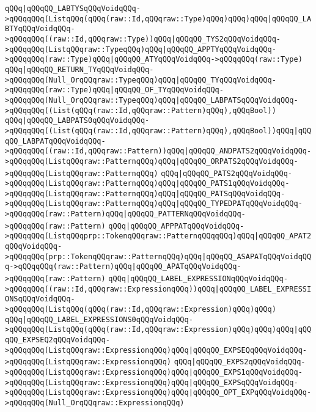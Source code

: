 \verb|qQQq|\verb#|qQQqQQ_LABTYSqQQqVoidqQQq->qQQqqQQq(ListqQQq(qQQq(raw::Id,qQQqraw::Type)qQQq)qQQq)qQQq|qQQqQQ_LABTYqQQqVoidqQQq->qQQqqQQq((raw::Id,qQQqraw::Type))qQQq|qQQqQQ_TYS2qQQqVoidqQQq->qQQqqQQq(ListqQQqraw::TypeqQQq)qQQq|qQQqQQ_APPTYqQQqVoidqQQq->qQQqqQQq(raw::Type)qQQq|qQQqQQ_ATYqQQqVoidqQQq->qQQqqQQq(raw::Type)#\newline
\verb|qQQq|\verb#|qQQqQQ_RETURN_TYqQQqVoidqQQq->qQQqqQQq(Null_OrqQQqraw::TypeqQQq)qQQq|qQQqQQ_TYqQQqVoidqQQq->qQQqqQQq(raw::Type)qQQq|qQQqQQ_OF_TYqQQqVoidqQQq->qQQqqQQq(Null_OrqQQqraw::TypeqQQq)qQQq|qQQqQQ_LABPATSqQQqVoidqQQq->qQQqqQQq((List(qQQq(raw::Id,qQQqraw::Pattern)qQQq),qQQqBool))#\newline
\verb|qQQq|\verb#|qQQqQQ_LABPATS0qQQqVoidqQQq->qQQqqQQq((List(qQQq(raw::Id,qQQqraw::Pattern)qQQq),qQQqBool))qQQq|qQQqQQ_LABPATqQQqVoidqQQq->qQQqqQQq((raw::Id,qQQqraw::Pattern))qQQq|qQQqQQ_ANDPATS2qQQqVoidqQQq->qQQqqQQq(ListqQQqraw::PatternqQQq)qQQq|qQQqQQ_ORPATS2qQQqVoidqQQq->qQQqqQQq(ListqQQqraw::PatternqQQq)#\newline
\verb|qQQq|\verb#|qQQqQQ_PATS2qQQqVoidqQQq->qQQqqQQq(ListqQQqraw::PatternqQQq)qQQq|qQQqQQ_PATS1qQQqVoidqQQq->qQQqqQQq(ListqQQqraw::PatternqQQq)qQQq|qQQqQQ_PATSqQQqVoidqQQq->qQQqqQQq(ListqQQqraw::PatternqQQq)qQQq|qQQqQQ_TYPEDPATqQQqVoidqQQq->qQQqqQQq(raw::Pattern)qQQq|qQQqQQ_PATTERNqQQqVoidqQQq->qQQqqQQq(raw::Pattern)#\newline
\verb|qQQq|\verb#|qQQqQQ_APPPATqQQqVoidqQQq->qQQqqQQq(ListqQQqprp::TokenqQQqraw::PatternqQQqqQQq)qQQq|qQQqQQ_APAT2qQQqVoidqQQq->qQQqqQQq(prp::TokenqQQqraw::PatternqQQq)qQQq|qQQqQQ_ASAPATqQQqVoidqQQq->qQQqqQQq(raw::Pattern)qQQq|qQQqQQ_APATqQQqVoidqQQq->qQQqqQQq(raw::Pattern)#\newline
\verb|qQQq|\verb#|qQQqQQ_LABEL_EXPRESSIONqQQqVoidqQQq->qQQqqQQq((raw::Id,qQQqraw::ExpressionqQQq))qQQq|qQQqQQ_LABEL_EXPRESSIONSqQQqVoidqQQq->qQQqqQQq(ListqQQq(qQQq(raw::Id,qQQqraw::Expression)qQQq)qQQq)#\newline
\verb|qQQq|\verb#|qQQqQQ_LABEL_EXPRESSIONS0qQQqVoidqQQq->qQQqqQQq(ListqQQq(qQQq(raw::Id,qQQqraw::Expression)qQQq)qQQq)qQQq|qQQqQQ_EXPSEQ2qQQqVoidqQQq->qQQqqQQq(ListqQQqraw::ExpressionqQQq)qQQq|qQQqQQ_EXPSEQqQQqVoidqQQq->qQQqqQQq(ListqQQqraw::ExpressionqQQq)#\newline
\verb|qQQq|\verb#|qQQqQQ_EXPS2qQQqVoidqQQq->qQQqqQQq(ListqQQqraw::ExpressionqQQq)qQQq|qQQqQQ_EXPS1qQQqVoidqQQq->qQQqqQQq(ListqQQqraw::ExpressionqQQq)qQQq|qQQqQQ_EXPSqQQqVoidqQQq->qQQqqQQq(ListqQQqraw::ExpressionqQQq)qQQq|qQQqQQ_OPT_EXPqQQqVoidqQQq->qQQqqQQq(Null_OrqQQqraw::ExpressionqQQq)#\newline
